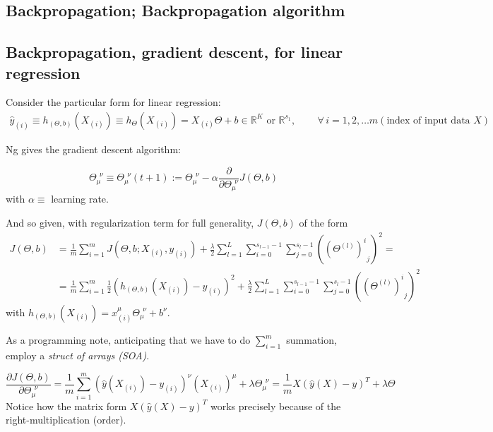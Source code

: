 \documentclass[10pt]{amsart}
\begin{document}
\begin{multicols*}{2}
\section{Backpropagation; Backpropagation algorithm}

\subsection{Backpropagation, gradient descent, for linear regression}  

Consider the particular form for linear regression:  
\[
\begin{gathered}
	\widehat{y}_{(i)}  \equiv h_{ (\Theta,b)}(X_{(i)}) \equiv h_{\Theta}(X_{(i)})=X_{(i)}\Theta + b \in \mathbb{R}^K \text{ or } \mathbb{R}^{s_1}, \qquad \, \forall \, i =1,2,\dots m (\text{index of input data $X$})
\end{gathered}
\]

Ng \cite{CS229} gives the gradient descent algorithm: 

\[
\Theta_{\mu}^{ \  \  \nu} \equiv \Theta_{\mu}^{ \  \  \nu}(t+1) := \Theta_{\mu}^{ \  \  \nu} - \alpha \frac{\partial }{ \partial \Theta_{\mu}^{ \  \  \nu} } J(\Theta,b)
\]
with $\alpha \equiv $ learning rate.  

And so given, with regularization term for full generality, $J(\Theta,b)$ of the form 
\[
\begin{aligned}
J(\Theta,b) & = \frac{1}{m} \sum_{i=1}^m J(\Theta,b; X_{(i)}, y_{(i)}) + \frac{\lambda}{2} \sum_{l=1}^L \sum_{i=0}^{s_{l-1}-1} \sum_{j=0}^{ s_l-1} ((\Theta^{(l)})^i_{\  \  j})^2 = \\ 
& =  \frac{ 1}{m} \sum_{i=1}^m \frac{1}{2} ( h_{(\Theta,b)}(X_{(i)}) - y_{(i)})^2 + \frac{\lambda}{2} \sum_{l=1}^L \sum_{i=0}^{s_{l-1}-1} \sum_{j=0}^{ s_l-1} ((\Theta^{(l)})^i_{\  \  j})^2
\end{aligned}
\]
with $h_{(\Theta,b)}(X_{(i)}) = x_{(i)}^{\mu} \Theta_{\mu}^{ \  \  \nu} + b^{\nu}$.  



As a programming note, anticipating that we have to do $\sum_{i=1}^m$ summation, employ a \emph{struct of arrays (SOA)}.  

\begin{equation}
\frac{\partial J(\Theta,b)}{ \partial \Theta_{\mu}^{ \  \  \nu} } = \frac{1}{m} \sum_{i=1}^m (\widehat{y}(X_{(i)}) - y_{(i)} )^{\nu} (X_{(i)})^{\mu} + \lambda \Theta_{\mu}^{ \  \  \nu} = \frac{1}{m} X(\widehat{y}(X) - y)^T + \lambda \Theta
\end{equation}
Notice how the matrix form $X(\widehat{y}(X) -y)^T$ works precisely because of the right-multiplication (order).  


\end{multicols*}
\end{document}
